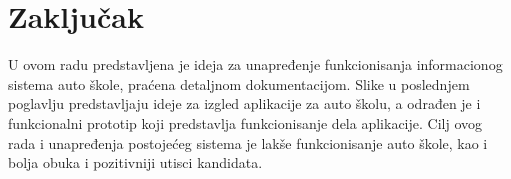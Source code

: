 \section{Zaključak}
\label{sec:zakljucak}
U ovom radu predstavljena je ideja za unapređenje funkcionisanja informacionog sistema auto škole, 
praćena detaljnom dokumentacijom. 
Slike u poslednjem poglavlju pre\-dstavljaju ideje za izgled aplikacije za auto školu, 
a odrađen je i funkcionalni prototip koji predstavlja funkcionisanje dela aplikacije.
 Cilj ovog rada i unapređenja postojećeg sistema je lakše funkcionisanje auto škole, kao i bolja obuka i pozitivniji utisci kandidata.
